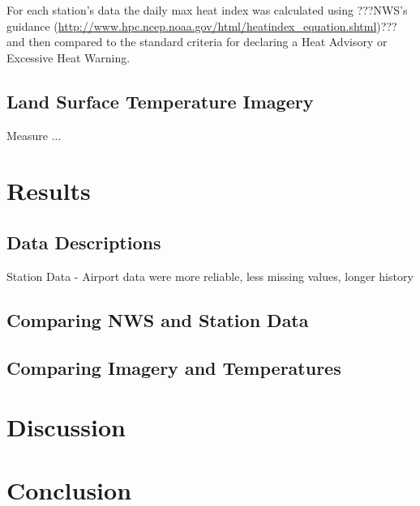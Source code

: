 \documentclass{ametsoc}
\begin{document}
For each station's data the daily max heat index was calculated using ???NWS's guidance (\url{http://www.hpc.ncep.noaa.gov/html/heatindex_equation.shtml})??? and then compared to the standard criteria for declaring a Heat Advisory or Excessive Heat Warning. 

\subsection{Land Surface Temperature Imagery}\label{subsec:WUNDERdata}
Measure ...

\section{Results}\label{section:results}
\subsection{Data Descriptions}\label{subsec:descriptions}
Station Data - Airport data were more reliable, less missing values, longer history

\subsection{Comparing NWS and Station Data}\label{subsec:hyp1}

\subsection{Comparing Imagery and Temperatures}\label{subsec:LST}

\section{Discussion}\label{section:discussion}



\section{Conclusion}\label{section:conclusion}



%

%
\end{document}
